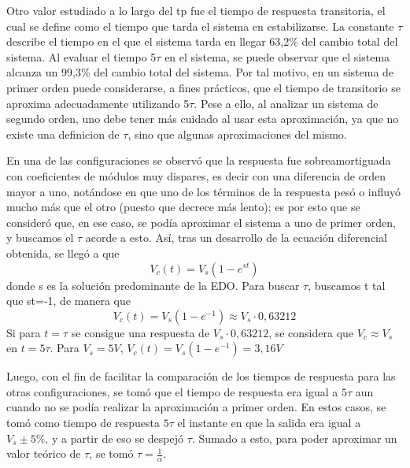\documentclass{article}
\begin{document}
\par Otro valor estudiado a lo largo del tp fue el tiempo de respuesta transitoria, el cual se define como el tiempo que tarda el sistema en estabilizarse. La constante $\tau$ describe el tiempo en el que el sistema tarda en llegar 63,2\% del cambio total del sistema. Al evaluar el tiempo 5$\tau$ en el sistema, se puede observar que el sistema alcanza un 99,3\% del cambio total del sistema. Por tal motivo, en un sistema de primer orden puede considerarse, a fines prácticos, que el tiempo de transitorio se aproxima adecuadamente utilizando 5$\tau$. Pese a ello, al analizar un sistema de segundo orden, uno debe tener más cuidado al usar esta aproximación, ya que no existe una definicion de $\tau$, sino que algunas aproximaciones del mismo.\par
En una de las configuraciones se observó que la respuesta fue sobreamortiguada con coeficientes de módulos muy dispares,
es decir con una diferencia de orden mayor a uno, notándose en que uno de los términos de la respuesta pesó o influyó mucho más 
que el otro (puesto que decrece más lento); es por esto que se consideró que, en ese caso, se podía aproximar el sistema a uno de 
primer orden, y buscamos el $\tau$ acorde a esto. Así, tras un desarrollo de la ecuación diferencial obtenida, se llegó a que
\begin{equation*}
    V_c(t) = V_s (1-e^{st})
\end{equation*}
donde s es la solución predominante de la EDO. Para buscar $\tau$, buscamos t tal que st=-1, de manera que
\begin{equation*}
    V_c(t) = V_s (1-e^{-1}) \approx V_s \cdot 0,63212
\end{equation*}
Si para $t=\tau$ se consigue una respuesta de $ V_s \cdot 0,63212$, se considera que $V_c \approx V_s$ en $t=5\tau$. Para $V_s=5 V$, $V_c(t) = V_s (1-e^{-1}) = 3,16 V$ \par

\par \par Luego, con el fin de facilitar la comparación de los tiempos de respuesta para las otras configuraciones, se tomó que el tiempo de respuesta era igual a $5\tau$ aun cuando no se podía realizar la aproximación a primer orden. En estos casos, se tomó como tiempo de respuesta $5\tau$ el instante en que la salida era igual a $V_s \pm 5\% $, y a partir de eso se despejó $\tau$. Sumado a esto, para poder aproximar un valor teórico de $\tau$, se tomó $\tau = \frac{1}{\alpha}$.
\end{document}
